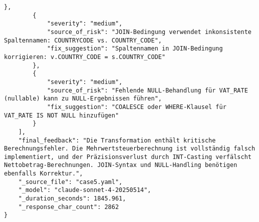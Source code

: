 \begin{lstlisting}[caption={Ausgabe: Claude Sonnet 4 Anwendungsfall 5 Konsistenzdurchlauf},label={claude_case5_prompt2}]
        },
        {
            "severity": "medium",
            "source_of_risk": "JOIN-Bedingung verwendet inkonsistente Spaltennamen: COUNTRYCODE vs. COUNTRY_CODE",
            "fix_suggestion": "Spaltennamen in JOIN-Bedingung korrigieren: v.COUNTRY_CODE = s.COUNTRY_CODE"
        },
        {
            "severity": "medium",
            "source_of_risk": "Fehlende NULL-Behandlung für VAT_RATE (nullable) kann zu NULL-Ergebnissen führen",
            "fix_suggestion": "COALESCE oder WHERE-Klausel für VAT_RATE IS NOT NULL hinzufügen"
        }
    ],
    "final_feedback": "Die Transformation enthält kritische Berechnungsfehler. Die Mehrwertsteuerberechnung ist vollständig falsch implementiert, und der Präzisionsverlust durch INT-Casting verfälscht Nettobetrag-Berechnungen. JOIN-Syntax und NULL-Handling benötigen ebenfalls Korrektur.",
    "_source_file": "case5.yaml",
    "_model": "claude-sonnet-4-20250514",
    "_duration_seconds": 1845.961,
    "_response_char_count": 2862
}
\end{lstlisting}

